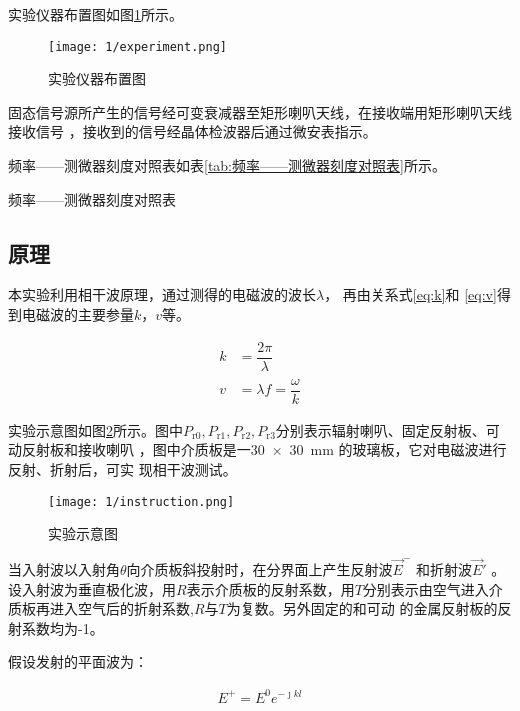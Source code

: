 \documentclass[../main]{subfiles}
\begin{document}
实验仪器布置图如图\ref{fig:实验仪器布置图}所示。

\begin{figure}[htbp]
	\centering
	\texttt{[image: 1/experiment.png]}
	\caption{实验仪器布置图}
	\label{fig:实验仪器布置图}
\end{figure}

固态信号源所产生的信号经可变衰减器至矩形喇叭天线，在接收端用矩形喇叭天线接收信号
，接收到的信号经晶体检波器后通过微安表指示。

频率——测微器刻度对照表如表\ref{tab:频率——测微器刻度对照表}所示。

\begin{table}[htbp]
	\centering
	\caption{频率——测微器刻度对照表}
	\label{tab:频率——测微器刻度对照表}
\end{table}

\subsection{原理}%
\label{sub:\arabic{chapter}原理}

本实验利用相干波原理，通过测得的电磁波的波长$ \lambda $， 再由关系式\ref{eq:k}和
\ref{eq:v}得到电磁波的主要参量$ k $，$ v $等。

\begin{align}
	\label{eq:k}
	k & = \dfrac{2\pi }{\lambda }\\
	\label{eq:v}
	v & = \lambda f = \dfrac{\omega }{k}
\end{align}

实验示意图如图\ref{fig:实验示意图}所示。图中$ P_\mathrm{r0}, P_\mathrm{r1},
P_\mathrm{r2}, P_\mathrm{r3} $分别表示辐射喇叭、固定反射板、可动反射板和接收喇叭
，图中介质板是一\SI{30x30}{\mm} 的玻璃板，它对电磁波进行反射、折射后，可实
现相干波测试。

\begin{figure}[htbp]
	\centering
	\texttt{[image: 1/instruction.png]}
	\caption{实验示意图}
	\label{fig:实验示意图}
\end{figure}

当入射波以入射角$ \theta $向介质板斜投射时，在分界面上产生反射波$ \vec{E}^- $
和折射波$ \vec{E}' $ 。设入射波为垂直极化波，用$ R $表示介质板的反射系数，用$ T
$分别表示由空气进入介质板再进入空气后的折射系数,$ R $与$ T $为复数。另外固定的和可动
的金属反射板的反射系数均为-1。

假设发射的平面波为：

\begin{align}
	E^+ = E^0 e^{-\jmath kl}
\end{align}
\end{document}
